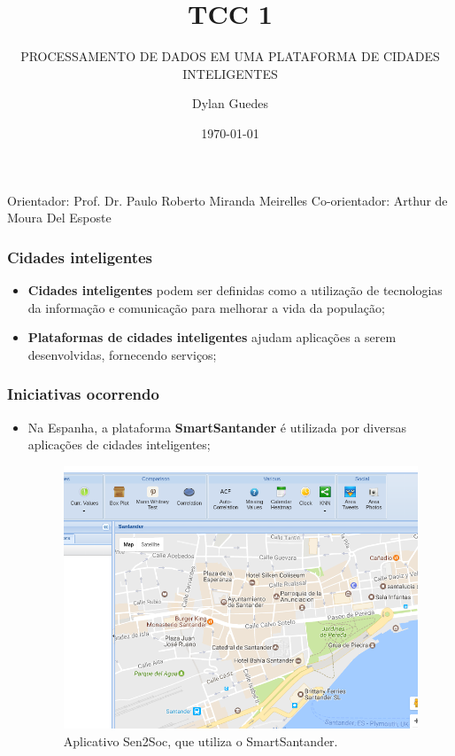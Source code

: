 \documentclass{beamer}
\title{TCC 1}
\subtitle{PROCESSAMENTO DE DADOS EM UMA PLATAFORMA DE CIDADES INTELIGENTES}
\author{Dylan Guedes}
\institute{UnB Gama}
\date{\today}
\begin{document}
    \begin{frame}
        \titlepage
        Orientador: Prof. Dr. Paulo Roberto Miranda Meirelles
        Co-orientador: Arthur de Moura Del Esposte
    \end{frame}

    \begin{frame}
        \frametitle{Cidades inteligentes}

        \begin{itemize}
            \item \textbf{Cidades inteligentes} podem ser definidas como a
                utilização de tecnologias da informação e comunicação para
                melhorar a vida da população;

            \item \textbf{Plataformas de cidades inteligentes} ajudam aplicações
                a serem desenvolvidas, fornecendo serviços;
        \end{itemize}
    \end{frame}

    \begin{frame}
        \frametitle{Iniciativas ocorrendo}
        \begin{itemize}
            \item Na Espanha, a plataforma \textbf{SmartSantander} é utilizada
                por diversas aplicações de cidades inteligentes;

                \begin{figure}
                    \includegraphics[scale=0.2]{figures/sen2soc.png}
                    \caption{Aplicativo Sen2Soc, que utiliza o SmartSantander.}
                \end{figure}
        \end{itemize}
    \end{frame}
\end{document}

